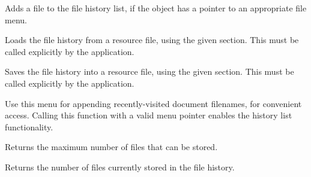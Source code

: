 Adds a file to the file history list, if the object has a pointer to an appropriate file menu.



Loads the file history from a resource file, using the given section. This must be called
explicitly by the application.



Saves the file history into a resource file, using the given section. This must be called
explicitly by the application.



Use this menu for appending recently-visited document filenames, for convenient
access. Calling this function with a valid menu pointer enables the history
list functionality.



Returns the maximum number of files that can be stored.



Returns the number of files currently stored in the file history.


